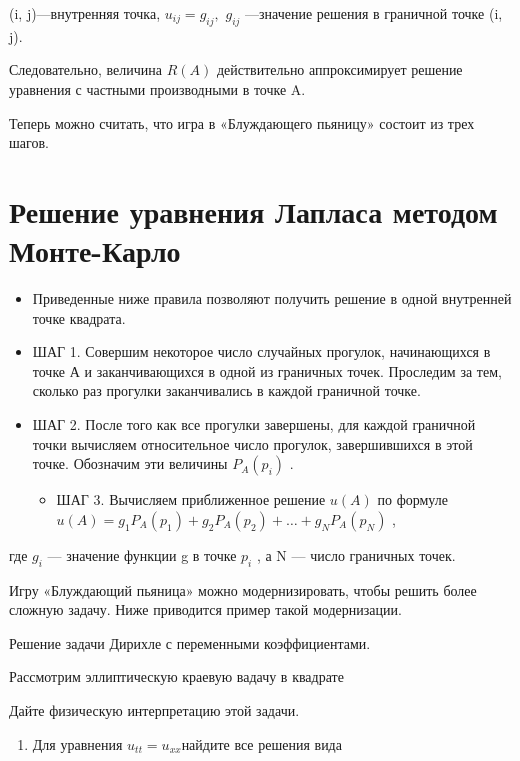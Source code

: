 \documentclass[
  ukrainian,
]{article}
\providecommand{\tightlist}{%
  \setlength{\itemsep}{0pt}\setlength{\parskip}{0pt}}
\begin{document}
(i, j)---внутренняя точка, \(u_{ij} = g_{ij},\) \(g_{ij}\) ---значение
решения в граничной точке (i, j).

Следовательно, величина \(R(A)\) действительно аппроксимирует решение
уравнения с частными производными в точке A.

Теперь можно считать, что игра в «Блуждающего пьяницу» состоит из трех
шагов.

\section{Решение уравнения Лапласа методом
Монте-Карло}\label{ux440ux435ux448ux435ux43dux438ux435-ux443ux440ux430ux432ux43dux435ux43dux438ux44f-ux43bux430ux43fux43bux430ux441ux430-ux43cux435ux442ux43eux434ux43eux43c-ux43cux43eux43dux442ux435-ux43aux430ux440ux43bux43e}

\begin{itemize}
\tightlist
\item
  Приведенные ниже правила позволяют получить решение в одной внутренней
  точке квадрата.
\item
  ШАГ 1. Совершим некоторое число случайных прогулок, начинающихся в
  точке А и заканчивающихся в одной из граничных точек. Проследим за
  тем, сколько раз прогулки заканчивались в каждой граничной точке.
\item
  ШАГ 2. После того как все прогулки завершены, для каждой граничной
  точки вычисляем относительное число прогулок, завершившихся в этой
  точке. Обозначим эти величины \(P_A(p_i)\) .

  \begin{itemize}
  \tightlist
  \item
    ШАГ 3. Вычисляем приближенное решение \(u(A)\) по формуле
    \(u(A) = g_1 P_A(p_1) + g_2 P_A(p_2) + \dots + g_N P_A(p_N)\) ,
  \end{itemize}
\end{itemize}

где \(g_i\) --- значение функции g в точке \(p_i\) , а N --- число
граничных точек.

Игру «Блуждающий пьяница» можно модернизировать, чтобы решить более
сложную задачу. Ниже приводится пример такой модернизации.

Решение задачи Дирихле с переменными коэффициентами.

Рассмотрим эллиптическую краевую вадачу в квадрате

Дайте физическую интерпретацию этой задачи.

\begin{enumerate}
\def\labelenumi{\arabic{enumi}.}
\setcounter{enumi}{3}
\tightlist
\item
  Для уравнения \(u_{tt} = u_{xx}\)найдите все решения вида
\end{enumerate}
\end{document}
